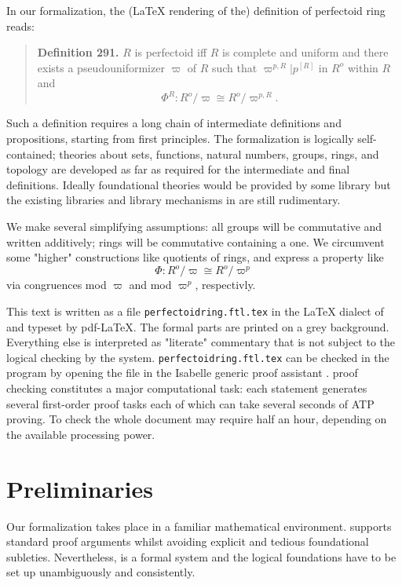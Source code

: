 \documentclass[11pt]{article}
\begin{document}
In our formalization, the (\LaTeX{} rendering of the) definition of perfectoid ring reads:
%
\begin{quote}
{\bf Definition 291.}
$R$ is perfectoid iff $R$ is complete and uniform and there
exists a pseudouniformizer $\varpi$ of $R$ such that    
$\varpi^{p,R} | p^{[R]}$ in $R^o$ within $R$
and 
$$\Phi^{R} : R^o / \varpi \cong R^o / \varpi^{p,R}.$$
\end{quote}

Such a definition requires a long chain of intermediate definitions
and propositions, starting from first principles.
The formalization is logically self-contained; theories 
about sets, functions, natural numbers, groups, rings, and topology are
developed as far as required for the intermediate and final definitions. 
Ideally foundational theories would be provided by some library
but the existing libraries and library mechanisms in \Naproche{} 
are still rudimentary.

We make
several simplifying assumptions:
all groups will be commutative and written additively;
rings will be commutative containing a one.
We circumvent some "higher" constructions like quotients of rings,
and express a property like
$$\Phi : R^o / \varpi \cong R^o / \varpi^{p}$$
via congruences mod $\varpi$ and mod $\varpi^{p}$, respectivly.


This text is written as a file 
\texttt{perfectoidring.ftl.tex}
in the \LaTeX{} dialect of \Naproche{} and
typeset by pdf-\LaTeX. The formal parts are printed on a grey background. 
Everything else
is interpreted as "literate" commentary that is not subject to the 
logical checking by the system.
\texttt{perfectoidring.ftl.tex}
can be checked in the \Naproche{} program by opening the file in the Isabelle generic 
proof assistant
\cite{Isabelle}.
\Naproche{} proof checking constitutes a major computational task: each statement generates several
first-order proof tasks each of which can take several seconds of
ATP proving. To check the whole document may require half an hour, 
depending on the available processing power.

\part{Preliminaries}

Our formalization takes place in a familiar mathematical environment. 
\Naproche{} supports standard proof arguments whilst avoiding explicit and tedious foundational
subleties. Nevertheless, \Naproche{} is a formal system and the logical foundations
have to be set up unambiguously and consistently.
\end{document}
